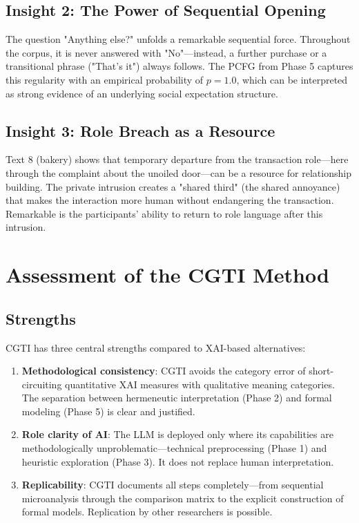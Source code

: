 \documentclass[12pt,a4paper]{article}
\begin{document}
\subsection{Insight 2: The Power of Sequential Opening}

The question "Anything else?" unfolds a remarkable sequential force. Throughout the corpus, it is never answered with "No"—instead, a further purchase or a transitional phrase ("That's it") always follows. The PCFG from Phase 5 captures this regularity with an empirical probability of $p=1.0$, which can be interpreted as strong evidence of an underlying social expectation structure.

\subsection{Insight 3: Role Breach as a Resource}

Text 8 (bakery) shows that temporary departure from the transaction role—here through the complaint about the unoiled door—can be a resource for relationship building. The private intrusion creates a "shared third" (the shared annoyance) that makes the interaction more human without endangering the transaction. Remarkable is the participants' ability to return to role language after this intrusion.

\section{Assessment of the CGTI Method}

\subsection{Strengths}

CGTI has three central strengths compared to XAI-based alternatives:

\begin{enumerate}
    \item \textbf{Methodological consistency}: CGTI avoids the category error of short-circuiting quantitative XAI measures with qualitative meaning categories. The separation between hermeneutic interpretation (Phase 2) and formal modeling (Phase 5) is clear and justified.
    
    \item \textbf{Role clarity of AI}: The LLM is deployed only where its capabilities are methodologically unproblematic—technical preprocessing (Phase 1) and heuristic exploration (Phase 3). It does not replace human interpretation.
    
    \item \textbf{Replicability}: CGTI documents all steps completely—from sequential microanalysis through the comparison matrix to the explicit construction of formal models. Replication by other researchers is possible.
\end{enumerate}
\end{document}
